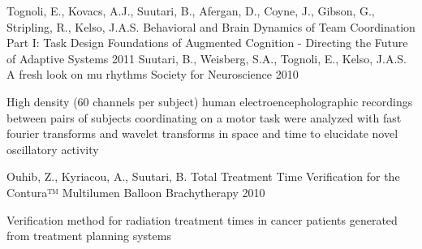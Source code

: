 \begin{cventries}
\cventry
{Tognoli, E., Kovacs, A.J., Suutari, B., Afergan, D., Coyne, J., Gibson, G., Stripling, R., Kelso, J.A.S.} %
{Behavioral and Brain Dynamics of Team Coordination Part I: Task Design} %
{Foundations of Augmented Cognition - Directing the Future of Adaptive Systems} %
{2011} %
{ %
}
\cventry
{Suutari, B., Weisberg, S.A., Tognoli, E., Kelso, J.A.S.} %
{A fresh look on mu rhythms} %
{Society for Neuroscience} %
{2010} %
{ %
\begin{cvitems}
\item {High density (60 channels per subject) human electroencepholographic recordings between pairs of subjects coordinating on a motor task were analyzed with fast fourier transforms and wavelet transforms in space and time to elucidate novel oscillatory activity}
\end{cvitems}
}
\cventry
{Ouhib, Z., Kyriacou, A., Suutari, B.} %
{Total Treatment Time Verification for the Contura™ Multilumen Balloon} %
{Brachytherapy} %
{2010} %
{ %
\begin{cvitems}
\item {Verification method for radiation treatment times in cancer patients generated from treatment planning systems}
\end{cvitems}
}




\end{cventries}
